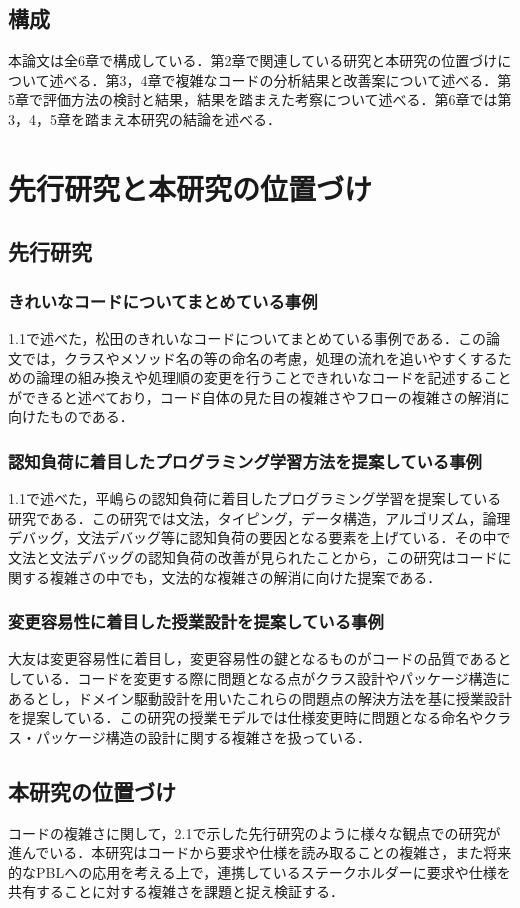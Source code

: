 \documentclass[12pt, a4paper]{jreport}
\begin{document}
\section{構成}
本論文は全6章で構成している．第2章で関連している研究と本研究の位置づけについて述べる．第3，4章で複雑なコードの分析結果と改善案について述べる．第5章で評価方法の検討と結果，結果を踏まえた考察について述べる．第6章では第3，4，5章を踏まえ本研究の結論を述べる．
\chapter{先行研究と本研究の位置づけ}
\section{先行研究}
\subsection{きれいなコードについてまとめている事例}
1.1で述べた，松田\cite{kireina}のきれいなコードについてまとめている事例である．この論文では，クラスやメソッド名の等の命名の考慮，処理の流れを追いやすくするための論理の組み換えや処理順の変更を行うことできれいなコードを記述することができると述べており，コード自体の見た目の複雑さやフローの複雑さの解消に向けたものである．
\subsection{認知負荷に着目したプログラミング学習方法を提案している事例}
1.1で述べた，平嶋ら\cite{haikei}の認知負荷に着目したプログラミング学習を提案している研究である．この研究では文法，タイピング，データ構造，アルゴリズム，論理デバッグ，文法デバッグ等に認知負荷の要因となる要素を上げている．その中で文法と文法デバッグの認知負荷の改善が見られたことから，この研究はコードに関する複雑さの中でも，文法的な複雑さの解消に向けた提案である．
\subsection{変更容易性に着目した授業設計を提案している事例}
大友\cite{Otomo}は変更容易性に着目し，変更容易性の鍵となるものがコードの品質であるとしている．コードを変更する際に問題となる点がクラス設計やパッケージ構造にあるとし，ドメイン駆動設計を用いたこれらの問題点の解決方法を基に授業設計を提案している．この研究の授業モデルでは仕様変更時に問題となる命名やクラス・パッケージ構造の設計に関する複雑さを扱っている．
\section{本研究の位置づけ}
コードの複雑さに関して，2.1で示した先行研究のように様々な観点での研究が進んでいる．本研究はコードから要求や仕様を読み取ることの複雑さ，また将来的なPBLへの応用を考える上で，連携しているステークホルダーに要求や仕様を共有することに対する複雑さを課題と捉え検証する．
\end{document}
